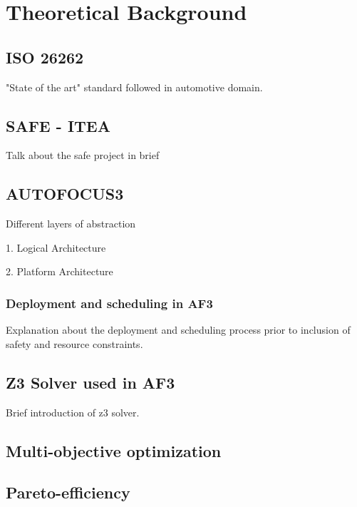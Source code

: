 \chapter{Theoretical Background}\label{chapter:theoretical_background}

\section{ISO 26262}

"State of the art" standard followed in automotive domain.  

\section{SAFE - ITEA}

Talk about the safe project in brief

\section{AUTOFOCUS3}

Different layers of abstraction

1. Logical Architecture

2. Platform Architecture

\subsection{Deployment and scheduling in AF3}

Explanation about the deployment and scheduling process prior to inclusion of safety and resource constraints.

\section{Z3 Solver used in AF3}

Brief introduction of z3 solver.

\section{Multi-objective optimization}

\section{Pareto-efficiency}



